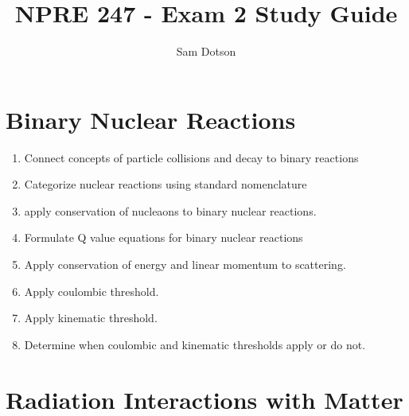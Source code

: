 \documentclass{article}
\author{Sam Dotson}
\title{NPRE 247 - Exam 2 Study Guide}
\begin{document}
\maketitle

\section{Binary Nuclear Reactions}
\begin{enumerate}
	\item{Connect concepts of particle collisions and decay to binary reactions}\\
	\item{Categorize nuclear reactions using standard nomenclature}\\
	\item{apply conservation of nucleaons to binary nuclear reactions.}\\
	\item{Formulate Q value equations for binary nuclear reactions}\\
	\item{Apply conservation of energy and linear momentum to scattering.}\\
	\item{Apply coulombic threshold.}\\
	\item{Apply kinematic threshold.}\\
	\item{Determine when coulombic and kinematic thresholds apply or do not.}\\
\end{enumerate}

\section{Radiation Interactions with Matter}
\end{document}
